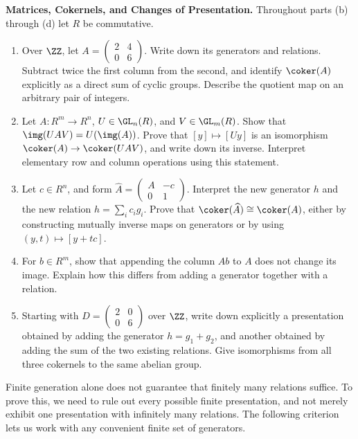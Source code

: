 \documentclass[12pt,reqno]{amsart}
\begin{document}
\begin{problems}
\item\label{p:matrices} \textbf{Matrices, Cokernels, and Changes of Presentation.} Throughout parts (b) through (d) let $R$ be commutative.
\begin{enumerate}
\item Over $\ZZ$, let $A=\left(\begin{smallmatrix}2&4\\0&6\end{smallmatrix}\right)$. Write down its generators and relations. Subtract twice the first column from the second, and identify $\coker(A)$ explicitly as a direct sum of cyclic groups. Describe the quotient map on an arbitrary pair of integers.
\item Let $A:R^m\to R^n$, $U\in\GL_n(R)$, and $V\in\GL_m(R)$. Show that $\img(UAV)=U(\img(A))$. Prove that $[y]\mapsto[Uy]$ is an isomorphism $\coker(A)\to\coker(UAV)$, and write down its inverse. Interpret elementary row and column operations using this statement.
\item Let $c\in R^n$, and form $\widehat A=\left(\begin{smallmatrix}A&-c\\0&1\end{smallmatrix}\right)$. Interpret the new generator $h$ and the new relation $h=\sum_ic_ig_i$. Prove that $\coker(\widehat A)\cong\coker(A)$, either by constructing mutually inverse maps on generators or by using $(y,t)\mapsto[y+tc]$.
\item For $b\in R^m$, show that appending the column $Ab$ to $A$ does not change its image. Explain how this differs from adding a generator together with a relation.
\item Starting with $D=\left(\begin{smallmatrix}2&0\\0&6\end{smallmatrix}\right)$ over $\ZZ$, write down explicitly a presentation obtained by adding the generator $h=g_1+g_2$, and another obtained by adding the sum of the two existing relations. Give isomorphisms from all three cokernels to the same abelian group.
\end{enumerate}
\end{problems}

\hrulefill

Finite generation alone does not guarantee that finitely many relations suffice. To prove this, we need to rule out every possible finite presentation, and not merely exhibit one presentation with infinitely many relations. The following criterion lets us work with any convenient finite set of generators.
\end{document}
